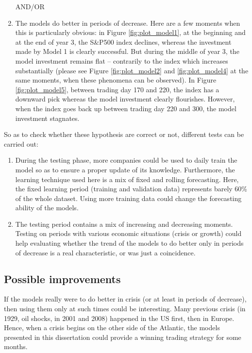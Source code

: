 \documentclass[11pt]{article}
\begin{document}
\begin{onehalfspace}
\begin{enumerate}
    AND/OR

    \item The models do better in periods of decrease. Here are a few moments when this is particularly obvious: in Figure \ref{fig:plot_model1}, at the beginning and at the end of year 3, the S\&P500 index declines, whereas the investment made by Model 1 is clearly successful. But during the middle of year 3, the model investment remains flat -- contrarily to the index which increases substantially (please see Figure \ref{fig:plot_model2} and \ref{fig:plot_model4} at the same moments, when these phenomena can be observed). In Figure \ref{fig:plot_model5}, between trading day 170 and 220, the index has a downward pick whereas the model investment clearly flourishes. However, when the index goes back up between trading day 220 and 300, the model investment stagnates.
\end{enumerate}

So as to check whether these hypothesis are correct or not, different tests can be carried out:

\begin{enumerate}
    \item During the testing phase, more companies could be used to daily train the model so as to ensure a proper update of its knowledge. Furthermore, the learning technique used here is a mix of fixed and rolling forecasting. Here, the fixed learning period (training and validation data) represents barely 60\% of the whole dataset. Using more training data could change the forecasting ability of the models.
    \item The testing period contains a mix of increasing and decreasing moments. Testing on periods with various economic situations (crisis or growth) could help evaluating whether the trend of the models to do better only in periods of decrease is a real characteristic, or was just a coincidence. 
\end{enumerate}

\subsection{Possible improvements}
\label{sec:poss_imp}

If the models really were to do better in crisis (or at least in periods of decrease), then using them only at such times could be interesting. Many previous crisis (in 1929, oil shocks, in 2001 and 2008) happened in the US first, then in Europe. Hence, when a crisis begins on the other side of the Atlantic, the models presented in this dissertation could provide a winning trading strategy for some months.


\end{onehalfspace}
\end{document}
